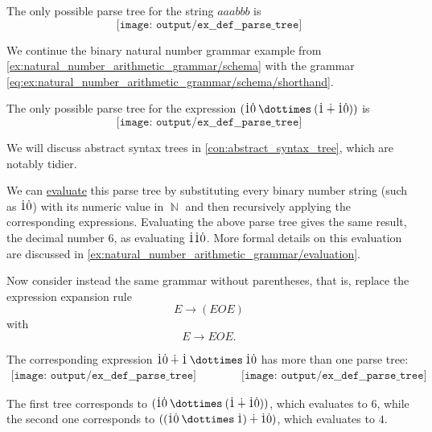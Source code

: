 \begin{example}
\begin{thmenum}
    The only possible parse tree for the string \( aaabbb \) is
    \begin{equation*}
      \texttt{[image: output/ex\_\_def\_\_parse\_tree]}
    \end{equation*}

     We continue the binary natural number grammar example from \cref{ex:natural_number_arithmetic_grammar/schema} with the grammar \eqref{eq:ex:natural_number_arithmetic_grammar/schema/shorthand}.

    The only possible parse tree for the expression \( (\syn1 \syn0 \syntimes (\syn1 \synplus \syn1 \syn0)) \) is
    \begin{equation*}
      \texttt{[image: output/ex\_\_def\_\_parse\_tree]}
    \end{equation*}

    We will discuss abstract syntax trees in \cref{con:abstract_syntax_tree}, which are notably tidier.

    We can \hyperref[con:evaluation]{evaluate} this parse tree by substituting every binary number string (such as \( \dot{1} \dot{0} \)) with its numeric value in \( \BbbN \) and then recursively applying the corresponding expressions. Evaluating the above parse tree gives the same result, the decimal number \( 6 \), as evaluating \( \dot{1} \dot{1} \dot{0} \). More formal details on this evaluation are discussed in \cref{ex:natural_number_arithmetic_grammar/evaluation}.

    Now consider instead the same grammar without parentheses, that is, replace the expression expansion rule
    \begin{equation*}
      E \to (E O E)
    \end{equation*}
    with
    \begin{equation*}
      E \to E O E.
    \end{equation*}

    The corresponding expression \( \syn1 \syn0 \synplus \syn1 \syntimes \syn1 \syn0 \) has more than one parse tree:
    \begin{equation*}
      \begin{aligned}
        \texttt{[image: output/ex\_\_def\_\_parse\_tree]}
        \qquad\qquad
        \texttt{[image: output/ex\_\_def\_\_parse\_tree]}
      \end{aligned}
    \end{equation*}

    The first tree corresponds to \( (\syn1\syn0 \syntimes (\syn1 \synplus \syn1\syn0)) \), which evaluates to \( 6 \), while the second one corresponds to \( ((\syn1 \syn0 \syntimes \syn1) \synplus \syn1\syn0) \), which evaluates to \( 4 \).


\end{thmenum}
\end{example}
